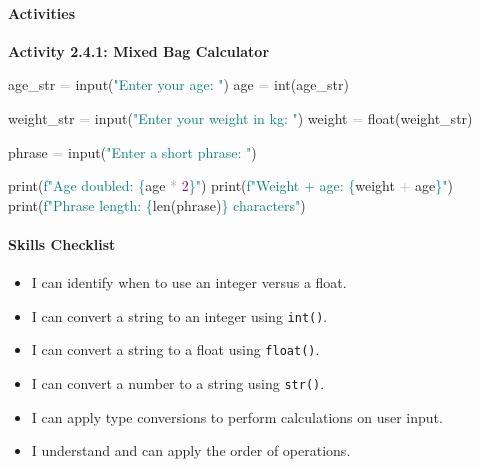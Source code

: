 \documentclass[
  justified,
  openright,
]{tufte-book}
\let\subsubsection\paragraph
\let\paragraph\paragraph
\newcommand{\BuiltInTok}[1]{#1}
\newcommand{\DecValTok}[1]{\textcolor{Purple}{#1}}
\newcommand{\NormalTok}[1]{#1}
\newcommand{\OperatorTok}[1]{\textcolor{DarkGray}{#1}}
\newcommand{\SpecialCharTok}[1]{\textcolor{Teal}{#1}}
\newcommand{\SpecialStringTok}[1]{\textcolor{Teal}{#1}}
\newcommand{\StringTok}[1]{\textcolor{Teal}{#1}}
\newenvironment{Shaded}{%
  \begin{snugshade}
}{%
  \end{snugshade}
}
\let\subsubsection\paragraph
\let\paragraph\paragraph
\providecommand{\tightlist}{%
  \setlength{\itemsep}{0pt}\setlength{\parskip}{0pt}}
\begin{document}
\subsubsection{Activities}\label{activities-5}

\textbf{Activity 2.4.1: Mixed Bag Calculator}

\begin{Shaded}
\begin{Highlighting}[]
\NormalTok{age\_str }\OperatorTok{=} \BuiltInTok{input}\NormalTok{(}\StringTok{"Enter your age: "}\NormalTok{)}
\NormalTok{age }\OperatorTok{=} \BuiltInTok{int}\NormalTok{(age\_str)}

\NormalTok{weight\_str }\OperatorTok{=} \BuiltInTok{input}\NormalTok{(}\StringTok{"Enter your weight in kg: "}\NormalTok{)}
\NormalTok{weight }\OperatorTok{=} \BuiltInTok{float}\NormalTok{(weight\_str)}

\NormalTok{phrase }\OperatorTok{=} \BuiltInTok{input}\NormalTok{(}\StringTok{"Enter a short phrase: "}\NormalTok{)}

\BuiltInTok{print}\NormalTok{(}\SpecialStringTok{f"Age doubled: }\SpecialCharTok{\{}\NormalTok{age }\OperatorTok{*} \DecValTok{2}\SpecialCharTok{\}}\SpecialStringTok{"}\NormalTok{)}
\BuiltInTok{print}\NormalTok{(}\SpecialStringTok{f"Weight + age: }\SpecialCharTok{\{}\NormalTok{weight }\OperatorTok{+}\NormalTok{ age}\SpecialCharTok{\}}\SpecialStringTok{"}\NormalTok{)}
\BuiltInTok{print}\NormalTok{(}\SpecialStringTok{f"Phrase length: }\SpecialCharTok{\{}\BuiltInTok{len}\NormalTok{(phrase)}\SpecialCharTok{\}}\SpecialStringTok{ characters"}\NormalTok{)}
\end{Highlighting}
\end{Shaded}

\subsubsection{Skills Checklist}\label{skills-checklist-10}

\begin{itemize}
\tightlist
\item[$\square$]
  I can identify when to use an integer versus a float.
\item[$\square$]
  I can convert a string to an integer using \texttt{int()}.
\item[$\square$]
  I can convert a string to a float using \texttt{float()}.
\item[$\square$]
  I can convert a number to a string using \texttt{str()}.
\item[$\square$]
  I can apply type conversions to perform calculations on user input.
\item[$\square$]
  I understand and can apply the order of operations.
\end{itemize}
\end{document}
